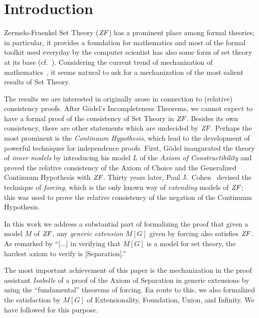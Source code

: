 \section{Introduction}
Zermelo-Fraenkel Set Theory ($\mathit{ZF}$) has a prominent place among formal
theories; in particular, it provides a foundation for mathematics and
most of the formal toolkit used everyday by the computer scientist has
also some form of set theory at its base
(cf.~\cite{paulson1995set}). Considering the current trend 
of mechanization of mathematics~\cite{avigad2018mechanization}, it
seems natural to ask for a mechanization of the most salient results
of Set Theory.

The results we are interested in originally arose in connection to
(relative) consistency proofs.
After G\"odel's Incompleteness Theorems, we cannot expect to have a
formal proof of the consistency of Set Theory in $\mathit{ZF}$. Besides its own
consistency, there are other statements which are undecided by $\mathit{ZF}$.
Perhaps the most prominent  is the
\emph{Continuum Hypothesis}, which lead to the development of powerful
techniques for independence proofs. First, G\"odel inaugurated the
theory of \emph{inner models} by introducing his model $L$ of
the \emph{Axiom of Constructibility} \cite{godel-L} and proved the
relative consistency of the Axiom of Choice and the Generalized
Continuum Hypothesis with $\mathit{ZF}$. Thirty years later, Paul
J.~Cohen~\cite{Cohen-CH-PNAS} devised the technique of \emph{forcing},
which is the only known way of \emph{extending} models of $\mathit{ZF}$; this
was used to prove the relative consistency of the 
negation of the Continuum Hypothesis. 

In this work we address a substantial part of formalizing the proof
that given a model $M$ of $\mathit{ZF}$, any \emph{generic extension} $M[G]$
given by forcing also satisfies $\mathit{ZF}$. As remarked by
\citet[][p.250]{kunen2011set} \enquote{[...] in verifying that $M[G]$
  is a model for set theory, the hardest axiom to verify is
  [Separation].}  

\medskip
{}
\medskip

The most important achievement of this paper is the
mechanization in the proof assistant \emph{Isabelle} of a proof of the
Axiom of Separation in 
generic extensions by using the ``fundamental'' theorems of forcing.
En route
to this, we also formalized the satisfaction by $M[G]$ of
Extensionality, Foundation, Union, and Infinity. %
We have  followed \cite{kunen2011set} for this purpose.

